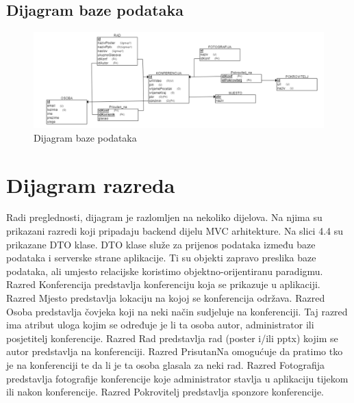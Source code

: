 			\subsection{Dijagram baze podataka}
					\begin{figure}[H]
						\includegraphics[scale=0.55]{slike/dijagram baze podataka.PNG} %
						\centering
						\caption{Dijagram baze podataka}
						\label{fig:promjene3}
					\end{figure}			
			\eject
			
			
		\section{Dijagram razreda}
		
		
			Radi preglednosti, dijagram je razlomljen na nekoliko dijelova. Na njima su prikazani razredi koji pripadaju backend dijelu MVC arhitekture.
			Na slici 4.4 su prikazane DTO klase. DTO klase služe za prijenos podataka između baze podataka i serverske strane aplikacije. Ti su objekti zapravo preslika baze podataka, ali umjesto relacijske koristimo objektno-orijentiranu paradigmu. 
			Razred Konferencija predstavlja konferenciju koja se prikazuje u aplikaciji. 
Razred Mjesto predstavlja lokaciju na kojoj se konferencija održava.
Razred Osoba predstavlja čovjeka koji na neki način sudjeluje na konferenciji.  Taj razred ima atribut uloga kojim se određuje je li ta osoba autor, administrator ili posjetitelj konferencije. 
Razred Rad predstavlja rad (poster i/ili pptx) kojim se autor predstavlja na konferenciji.
Razred PrisutanNa omogućuje da pratimo tko je na konferenciji te da li je ta osoba glasala za neki rad.
Razred Fotografija predstavlja fotografije konferencije koje administrator stavlja u aplikaciju tijekom ili nakon konferencije.
Razred Pokrovitelj predstavlja sponzore konferencije. 

